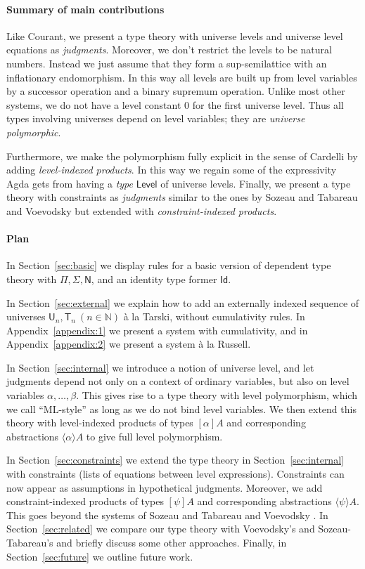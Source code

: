 \documentclass[a4paper,UKenglish,cleveref, autoref, thm-restate]{lipics-v2021}
\newcommand{\Id}{\mathsf{Id}}
\newcommand{\NN}{\mathsf{N}}
\newcommand{\Nat}{\mathbb{N}}
\newcommand{\UU}{\mathsf{U}}
\newcommand{\AgdaLevel}{\mathsf{Level}}
\newcommand{\lam}[1]{{\langle}#1{\rangle}}
\newcommand{\T}{\mathsf{T}}
\begin{document}
\paragraph*{Summary of main contributions}
Like Courant, we present a type theory with
universe levels  and universe level equations as \emph{judgments}. Moreover, we don't restrict the levels to be natural numbers. Instead we just assume that they form a sup-semilattice with an inflationary endomorphism. In this way all levels are built up from level variables by a successor operation and a binary supremum operation. Unlike most other systems, we do not have a level constant $0$ for the first universe level. Thus all types involving universes depend on level variables; they are {\em universe polymorphic}.

Furthermore, we make the polymorphism fully explicit in the sense of Cardelli
by adding \emph{level-indexed products}. In this way we regain some of
the expressivity Agda gets from having a \emph{type}
$\AgdaLevel$ of universe levels.
Finally, we present a type theory with constraints as \emph{judgments} similar to the ones by Sozeau and Tabareau \cite{SozeauTabareau:coq} and Voevodsky \cite{VV} but extended with \emph{constraint-indexed products}.

\paragraph*{Plan}
In Section~\ref{sec:basic} we display rules for a basic version of dependent
type theory with $\Pi, \Sigma, \NN$, and an identity type former $\Id$.

In Section~\ref{sec:external} we explain how to add an externally indexed
sequence of universes
$\UU_n, \T_n~(n\in\Nat)$ \`a la Tarski, without cumulativity rules.
In Appendix~\ref{appendix:1} we present a system with cumulativity,
and in Appendix~\ref{appendix:2} we present a system \`a la Russell.

In Section~\ref{sec:internal} we introduce a notion of universe level,
and let judgments depend not only on a context of ordinary variables,
but also on level variables $\alpha, \ldots, \beta$.
This gives rise to a type theory with level polymorphism, which we call
``ML-style'' as long as we do not bind level variables.
We then extend this theory with level-indexed products of
types $[\alpha]A$ and corresponding abstractions $\lam{\alpha}A$
to give full level polymorphism.

In Section~\ref{sec:constraints} we extend the type theory in
Section~\ref{sec:internal} with constraints (lists of equations between level expressions). Constraints can now appear as assumptions in hypothetical judgments. Moreover, we add
constraint-indexed products of types $[\psi]A$ and corresponding
abstractions $\lam{\psi}A$. This goes beyond the systems of Sozeau and Tabareau \cite{SozeauTabareau:coq} and Voevodsky \cite{VV}.
In Section~\ref{sec:related} we
compare our type theory with Voevodsky's and Sozeau-Tabareau's
and briefly discuss some other approaches.
Finally, in Section~\ref{sec:future} we outline future work.
\end{document}
